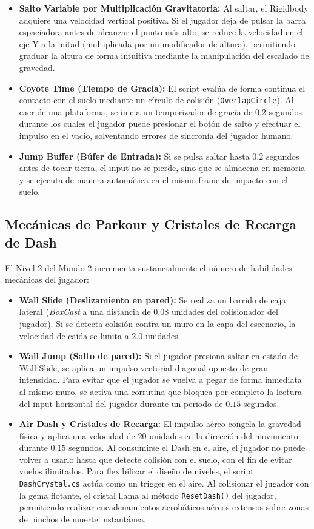 \begin{itemize}
    \item \textbf{Salto Variable por Multiplicación Gravitatoria:} Al saltar, el Rigidbody adquiere una velocidad vertical positiva. Si el jugador deja de pulsar la barra espaciadora antes de alcanzar el punto más alto, se reduce la velocidad en el eje Y a la mitad (multiplicada por un modificador de altura), permitiendo graduar la altura de forma intuitiva mediante la manipulación del escalado de gravedad.
    \item \textbf{Coyote Time (Tiempo de Gracia):} El script evalúa de forma continua el contacto con el suelo mediante un círculo de colisión (\texttt{OverlapCircle}). Al caer de una plataforma, se inicia un temporizador de gracia de $0.2$ segundos durante los cuales el jugador puede presionar el botón de salto y efectuar el impulso en el vacío, solventando errores de sincronía del jugador humano.
    \item \textbf{Jump Buffer (Búfer de Entrada):} Si se pulsa saltar hasta $0.2$ segundos antes de tocar tierra, el input no se pierde, sino que se almacena en memoria y se ejecuta de manera automática en el mismo frame de impacto con el suelo.
\end{itemize}

\subsection{Mecánicas de Parkour y Cristales de Recarga de Dash}
El Nivel 2 del Mundo 2 incrementa sustancialmente el número de habilidades mecánicas del jugador:
\begin{itemize}
    \item \textbf{Wall Slide (Deslizamiento en pared):} Se realiza un barrido de caja lateral (\textit{BoxCast} a una distancia de $0.08$ unidades del colisionador del jugador). Si se detecta colisión contra un muro en la capa del escenario, la velocidad de caída se limita a $2.0$ unidades.
    \item \textbf{Wall Jump (Salto de pared):} Si el jugador presiona saltar en estado de Wall Slide, se aplica un impulso vectorial diagonal opuesto de gran intensidad. Para evitar que el jugador se vuelva a pegar de forma inmediata al mismo muro, se activa una corrutina que bloquea por completo la lectura del input horizontal del jugador durante un periodo de $0.15$ segundos.
    \item \textbf{Air Dash y Cristales de Recarga:} El impulso aéreo congela la gravedad física y aplica una velocidad de $20$ unidades en la dirección del movimiento durante $0.15$ segundos. Al consumirse el Dash en el aire, el jugador no puede volver a usarlo hasta que detecte colisión con el suelo, con el fin de evitar vuelos ilimitados. Para flexibilizar el diseño de niveles, el script \texttt{DashCrystal.cs} actúa como un trigger en el aire. Al colisionar el jugador con la gema flotante, el cristal llama al método \texttt{ResetDash()} del jugador, permitiendo realizar encadenamientos acrobáticos aéreos extensos sobre zonas de pinchos de muerte instantánea.
\end{itemize}

